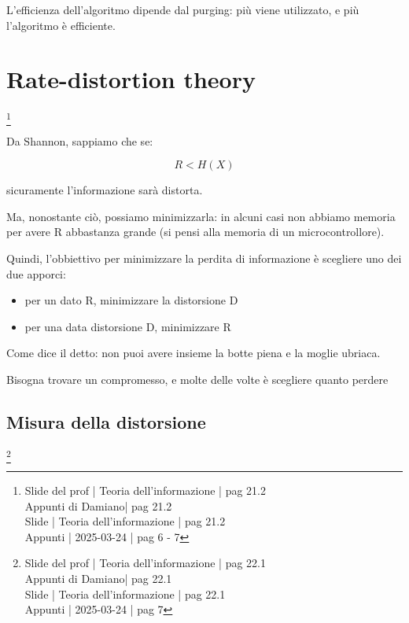 L'efficienza dell'algoritmo dipende dal purging: più viene utilizzato, e più l'algoritmo è efficiente. \newline 


\newpage 

\section{Rate-distortion theory}
\footnote{Slide del prof | Teoria dell'informazione | pag 21.2 \\  
Appunti di Damiano| pag 21.2 \\
Slide | Teoria dell'informazione | pag 21.2 \\
Appunti | 2025-03-24 | pag 6 - 7
}

Da Shannon, sappiamo che se: 

{
    \Large 
    \begin{equation}
        R < H(X)
    \end{equation}
}

sicuramente l'informazione sarà distorta. \newline 

Ma, nonostante ciò, possiamo minimizzarla: in alcuni casi non abbiamo memoria per avere R abbastanza grande (si pensi alla memoria di un microcontrollore). \newline 

Quindi, l'obbiettivo per minimizzare la perdita di informazione è scegliere uno dei due apporci:

\begin{itemize}
    \item per un dato R, minimizzare la distorsione D 
    \item per una data distorsione D, minimizzare R
\end{itemize}

\begin{tcolorbox}
    Come dice il detto: non puoi avere insieme la botte piena e la moglie ubriaca. \newline 

    Bisogna trovare un compromesso, e molte delle volte è scegliere quanto perdere
\end{tcolorbox}

\newpage 

\subsection{Misura della distorsione}
\footnote{Slide del prof | Teoria dell'informazione | pag 22.1 \\  
Appunti di Damiano| pag 22.1 \\
Slide | Teoria dell'informazione | pag 22.1 \\
Appunti | 2025-03-24 | pag 7
}

